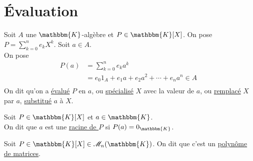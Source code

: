 \part{Évaluation}

\begin{defn}
	Soit $A$ une $\mathbbm{K}$-algèbre et $P \in \mathbbm{K}[X]$. On pose $P =  \sum_{k=0}^n e_k X^k$. Soit $a \in A$.\\
	On pose
	\begin{align*}
		P(a) &= \sum_{k=0}^n e_k a^k\\
		&= e_0 1_A + e_1 a + e_2 a^2 + \cdots + e_n a^n \in A \\
	\end{align*}
	On dit qu'on a \underline{évalué} $P$ en $a$, ou \underline{spécialisé} $X$ avec la valeur de $a$, ou \underline{remplacé} $X$ par $a$, \underline{substitué} $a$ à $X$.
\end{defn}

\begin{defn}
	Soit $P \in \mathbbm{K}[X]$ et $a \in \mathbbm{K}$. \\
	On dit que $a$ est une \underline{racine de $P$} si $P(a) = 0_{\mathbbm{K}}$.
\end{defn}

\begin{defn}
	Soit $P \in \mathbbm{K}[X] \in \mathcal{M}_n(\mathbbm{K})$. On dit que c'est un \underline{polynôme de matrices}.
\end{defn}


